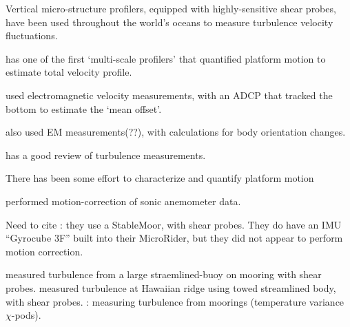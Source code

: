 
Vertical micro-structure profilers, equipped with highly-sensitive shear probes, have been used throughout the world's oceans to measure turbulence velocity fluctuations. 



\cite[]{Winkel++1996} has one of the first `multi-scale profilers' that quantified platform motion to estimate total velocity profile.

\cite[]{Stahr+Sanford1999} used electromagnetic velocity measurements, with an ADCP that tracked the bottom to estimate the `mean offset'. 

\cite[]{Hayes++1984} also used EM measurements(??), with calculations for body orientation changes.

\cite{Lueck++2002} has a good review of turbulence measurements. 

There has been some effort to characterize and quantify platform motion 

\cite{Miller++2008} performed motion-correction of sonic anemometer data.

Need to cite \cite[]{Paskyabi+Fer2013}: they use a StableMoor, with shear probes. They do have an IMU ``Gyrocube 3F'' built into their MicroRider, but they did not appear to perform motion correction.

\cite[]{Lueck+Huang1999} measured turbulence from a large straemlined-buoy on mooring with shear probes. \cite[]{Klymak++2003} measured turbulence at Hawaiian ridge using towed streamlined body, with shear probes. \cite[]{Moum+Nash2009b}: measuring turbulence from moorings (temperature variance $\chi$-pods).

